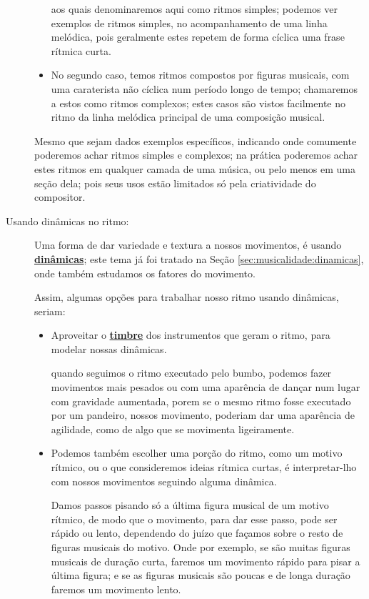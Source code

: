 \begin{description}
\begin{itemize}
aos quais denominaremos aqui como ritmos simples; podemos ver exemplos de ritmos simples,
no acompanhamento de uma linha melódica, 
pois geralmente estes repetem de forma cíclica uma frase rítmica curta.
\item No segundo caso, temos  ritmos compostos por figuras musicais,
com uma caraterista não cíclica num período longo de tempo; 
chamaremos a estos como ritmos complexos;
estes casos são vistos facilmente no ritmo da linha melódica principal de uma composição musical.
\end{itemize}
Mesmo que sejam dados exemplos específicos, 
indicando onde comumente poderemos achar ritmos simples e complexos;
na prática poderemos achar estes ritmos em qualquer camada de uma música,
ou pelo menos em uma seção dela; 
pois seus usos estão limitados só pela criatividade do compositor.
\item [Usando dinâmicas no ritmo:] 
Uma forma de dar variedade e textura a nossos movimentos, 
é usando \hyperref[sec:musicalidade:dinamicas]{\textbf{dinâmicas}}; este tema já foi tratado na Seção \ref{sec:musicalidade:dinamicas},
onde também estudamos os fatores do movimento.

Assim, algumas opções para trabalhar nosso ritmo usando dinâmicas, seriam:
\begin{itemize}
\item Aproveitar o \hyperref[sec:pos:timbre]{\textbf{timbre}} dos instrumentos que geram o ritmo,
para modelar nossas dinâmicas.
\begin{example}
quando seguimos  o ritmo executado pelo bumbo,
podemos fazer movimentos mais pesados ou com uma aparência de dançar num lugar com gravidade aumentada,
porem se o mesmo ritmo fosse executado por um pandeiro,
nossos movimento,
poderiam dar uma aparência de agilidade, 
como de algo que se movimenta ligeiramente.
\end{example}
\item Podemos também escolher uma porção do ritmo, como um motivo rítmico,
 ou o que consideremos ideias rítmica curtas,
é interpretar-lho com nossos movimentos seguindo alguma dinâmica.
\begin{example}
Damos passos pisando só a última figura musical de um motivo rítmico,
de modo que o movimento, para dar esse passo, pode ser rápido ou lento,
dependendo do juízo que façamos sobre o resto de figuras musicais do motivo.
Onde por exemplo, se são muitas figuras musicais de duração curta, 
faremos um movimento rápido para pisar a última figura;
e se as figuras musicais são poucas e de longa duração faremos um movimento lento.
\end{example}
\end{itemize}
\end{description}

